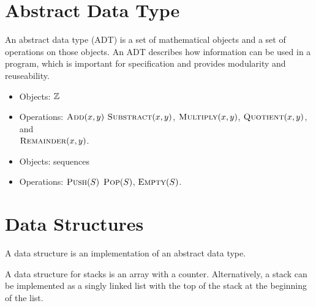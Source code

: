 \section{Abstract Data Type}  

\vspace{0.5\parskip}

\begin{definition}
    An abstract data type (ADT) is a set of mathematical objects and a set of operations on those objects. An ADT describes how information can be used in a program, which is important for specification and provides modularity and reuseability.
\end{definition}

\begin{example}
    \hfill
    \begin{itemize}
        \item Objects: $\mathbb{Z}$
        \item Operations: $\textsc{Add}(x,y)$ $\textsc{Substract}(x,y)$, $\textsc{Multiply}(x,y)$, $\textsc{Quotient}(x,y)$, and \\ $\textsc{Remainder}(x,y)$.
    \end{itemize}
\end{example}
\begin{example}
    \hfill
    \begin{itemize}
        \item Objects: sequences
        \item Operations: $\textsc{Push}(S)$ $\textsc{Pop}(S)$, $\textsc{Empty}(S)$.
    \end{itemize}
\end{example}


\section{Data Structures}

\vspace{0.5\parskip}

\begin{definition} 
    A data structure is an implementation of an abstract data type.
\end{definition}

\begin{example}
    A data structure for stacks is an array with a counter. Alternatively, a stack can be implemented as a singly linked list with the top of the stack at the beginning of the list.
\end{example}

